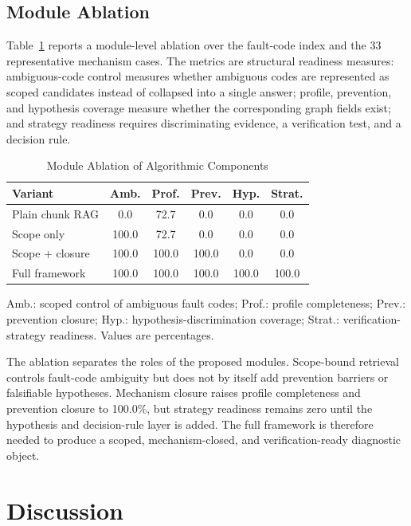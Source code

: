\documentclass[lettersize,journal]{IEEEtran}
\begin{document}
\subsection{Module Ablation}
Table~\ref{tab:module_ablation} reports a module-level ablation over the fault-code index and the 33 representative mechanism cases. The metrics are structural readiness measures: ambiguous-code control measures whether ambiguous codes are represented as scoped candidates instead of collapsed into a single answer; profile, prevention, and hypothesis coverage measure whether the corresponding graph fields exist; and strategy readiness requires discriminating evidence, a verification test, and a decision rule.

\begin{table}[htbp]
\caption{Module Ablation of Algorithmic Components}
\label{tab:module_ablation}
\centering
\scriptsize
\begin{tabular}{lccccc}
\toprule
Variant & Amb. & Prof. & Prev. & Hyp. & Strat. \\
\midrule
Plain chunk RAG & 0.0 & 72.7 & 0.0 & 0.0 & 0.0 \\
Scope only & 100.0 & 72.7 & 0.0 & 0.0 & 0.0 \\
Scope + closure & 100.0 & 100.0 & 100.0 & 0.0 & 0.0 \\
Full framework & 100.0 & 100.0 & 100.0 & 100.0 & 100.0 \\
\bottomrule
\end{tabular}
\vspace{1mm}
\begin{flushleft}
\scriptsize Amb.: scoped control of ambiguous fault codes; Prof.: profile completeness; Prev.: prevention closure; Hyp.: hypothesis-discrimination coverage; Strat.: verification-strategy readiness. Values are percentages.
\end{flushleft}
\end{table}

The ablation separates the roles of the proposed modules. Scope-bound retrieval controls fault-code ambiguity but does not by itself add prevention barriers or falsifiable hypotheses. Mechanism closure raises profile completeness and prevention closure to 100.0\%, but strategy readiness remains zero until the hypothesis and decision-rule layer is added. The full framework is therefore needed to produce a scoped, mechanism-closed, and verification-ready diagnostic object.



\section{Discussion}
\end{document}
